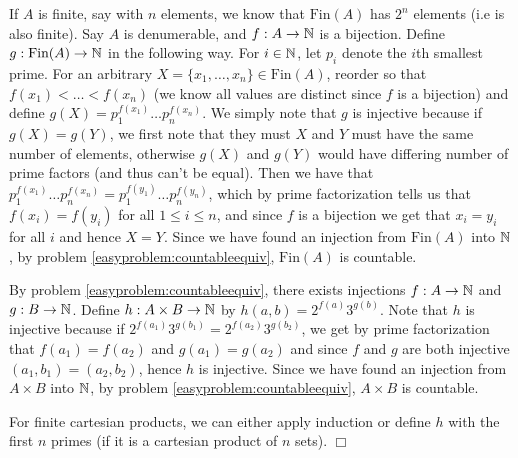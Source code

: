 \documentclass{article}
\begin{document}
 {
    If $A$ is finite, say with $n$ elements, we know that $\text{Fin}(A)$ has $2^{n}$ elements (i.e is also finite). Say $A$ is denumerable, and $f: A\to\mathbb{N}$ is a bijection. Define $g: \text{Fin}(A)\to \mathbb{N}$ in the following way. For $i\in \mathbb{N}$, let $p_{i}$ denote the $i$th smallest prime. For an arbitrary $X = \{x_{1},\dots, x_{n}\}\in \text{Fin}(A)$, reorder so that $f(x_{1}) < \dots < f(x_{n})$ (we know all values are distinct since $f$ is a bijection) and define $g(X) = p_{1}^{f(x_{1})}\dots p_{n}^{f(x_{n})}$. We simply note that $g$ is injective because if $g(X) = g(Y)$, we first note that they must $X$ and $Y$ must have the same number of elements, otherwise $g(X)$ and $g(Y)$ would have differing number of prime factors (and thus can't be equal). Then we have that $p_{1}^{f(x_{1})}\dots p_{n}^{f(x_{n})} = p_{1}^{f(y_{1})}\dots p_{n}^{f(y_{n})}$, which by prime factorization tells us that $f(x_{i}) = f(y_{i})$ for all $1\leq i \leq n$, and since $f$ is a bijection we get that $x_{i} = y_{i}$ for all $i$ and hence $X = Y$. Since we have found an injection from $\text{Fin}(A)$ into $\mathbb{N}$, by problem \ref{easyproblem:countableequiv}, $\text{Fin}(A)$ is countable.
} 
 {
    By problem \ref{easyproblem:countableequiv}, there exists injections $f: A\to \mathbb{N}$ and $g: B\to \mathbb{N}$. Define $h: A\times B\to \mathbb{N}$ by $h(a,b) = 2^{f(a)}3^{g(b)}$. Note that $h$ is injective because if $2^{f(a_{1})}3^{g(b_{1})} = 2^{f(a_{2})}3^{g(b_{2})}$, we get by prime factorization that $f(a_{1}) = f(a_{2})$ and $g(a_{1}) = g(a_{2})$ and since $f$ and $g$ are both injective $(a_{1}, b_{1}) = (a_{2}, b_{2})$, hence $h$ is injective. Since we have found an injection from $A\times B$ into $\mathbb{N}$, by  problem \ref{easyproblem:countableequiv}, $A\times B$ is countable. 

    For finite cartesian products, we can either apply induction or define $h$ with the first $n$ primes (if it is a cartesian product of $n$ sets). $\Box$
}
\end{document}
